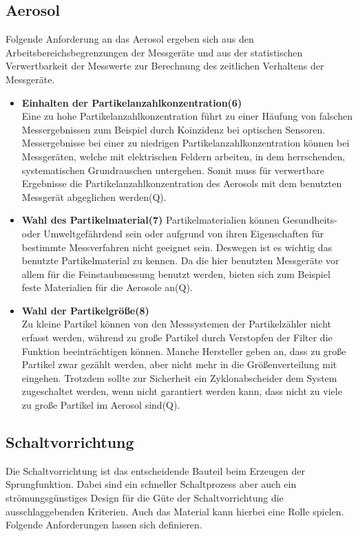 \subsection{Aerosol}
Folgende Anforderung an das Aerosol ergeben sich aus den Arbeitsbereichsbegrenzungen der Messger\"{a}te und aus der statistischen Verwertbarkeit der Messwerte zur Berechnung des zeitlichen Verhaltens der Messger\"{a}te.

\begin{itemize}
\item \textbf{Einhalten der Partikelanzahlkonzentration(6)}\\
Eine zu hohe Partikelanzahlkonzentration f\"{u}hrt zu einer H\"{a}ufung von falschen Messergebnissen zum Beispiel durch Koinzidenz bei optischen Sensoren. Messergebnisse bei einer zu niedrigen Partikelanzahlkonzentration k\"{o}nnen bei Messger\"{a}ten, welche mit elektrischen Feldern arbeiten, in dem herrschenden, systematischen Grundrauschen untergehen. Somit muss f\"{u}r verwertbare Ergebnisse die Partikelanzahlkonzentration des Aerosols mit dem benutzten Messger\"{a}t abgeglichen werden(Q).

\item \textbf{Wahl des Partikelmaterial(7)} 
Partikelmaterialien k\"{o}nnen Gesundheits- oder Umweltgef\"{a}hrdend sein oder aufgrund von ihren Eigenschaften f\"{u}r bestimmte Messverfahren nicht geeignet sein. Deswegen ist es wichtig das benutzte Partikelmaterial zu kennen. Da die hier benutzten Messger\"{a}te vor allem f\"{u}r die Feinstaubmessung benutzt werden, bieten sich zum Beispiel feste Materialien f\"{u}r die Aerosole an(Q).

\item \textbf{Wahl der Partikelgr\"{o}{\ss}e(8)}\\ 
Zu kleine Partikel k\"{o}nnen von den Messsystemen der Partikelz\"{a}hler nicht erfasst werden, w\"{a}hrend zu gro{\ss}e Partikel durch Verstopfen der Filter die Funktion beeintr\"{a}chtigen k\"{o}nnen. Manche Hersteller geben an, dass zu gro{\ss}e Partikel zwar gez\"{a}hlt werden, aber nicht mehr in die Gr\"{o}{\ss}enverteilung mit eingehen. Trotzdem sollte zur Sicherheit ein Zyklonabscheider dem System zugeschaltet werden, wenn nicht garantiert werden kann, dass nicht zu viele zu gro{\ss}e Partikel im Aerosol sind(Q).
\end{itemize}

\subsection{Schaltvorrichtung}
Die Schaltvorrichtung ist das entscheidende Bauteil beim Erzeugen der Sprungfunktion. Dabei sind ein schneller Schaltprozess aber auch ein str\"{o}mungsg\"{u}nstiges Design f\"{u}r die G\"{u}te der Schaltvorrichtung die ausschlaggebenden Kriterien. Auch das Material kann hierbei eine Rolle spielen. Folgende Anforderungen lassen sich definieren.

